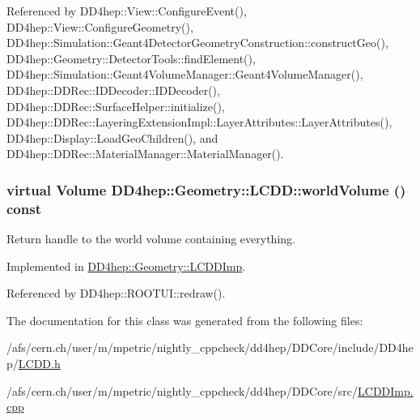 Referenced by DD4hep::View::ConfigureEvent(), DD4hep::View::ConfigureGeometry(), DD4hep::Simulation::Geant4DetectorGeometryConstruction::constructGeo(), DD4hep::Geometry::DetectorTools::findElement(), DD4hep::Simulation::Geant4VolumeManager::Geant4VolumeManager(), DD4hep::DDRec::IDDecoder::IDDecoder(), DD4hep::DDRec::SurfaceHelper::initialize(), DD4hep::DDRec::LayeringExtensionImpl::LayerAttributes::LayerAttributes(), DD4hep::Display::LoadGeoChildren(), and DD4hep::DDRec::MaterialManager::MaterialManager().\hypertarget{class_d_d4hep_1_1_geometry_1_1_l_c_d_d_aa7d089039516ff312cf95168288019fe}{
\subsubsection[{worldVolume}]{\setlength{\rightskip}{0pt plus 5cm}virtual {\bf Volume} DD4hep::Geometry::LCDD::worldVolume () const}}
\label{class_d_d4hep_1_1_geometry_1_1_l_c_d_d_aa7d089039516ff312cf95168288019fe}


Return handle to the world volume containing everything. 

Implemented in \hyperlink{class_d_d4hep_1_1_geometry_1_1_l_c_d_d_imp_a299a2cba9bd2dcb247df2e254fb07125}{DD4hep::Geometry::LCDDImp}.

Referenced by DD4hep::ROOTUI::redraw().

The documentation for this class was generated from the following files:\begin{DoxyCompactItemize}
\item 
/afs/cern.ch/user/m/mpetric/nightly\_\-cppcheck/dd4hep/DDCore/include/DD4hep/\hyperlink{_l_c_d_d_8h}{LCDD.h}\item 
/afs/cern.ch/user/m/mpetric/nightly\_\-cppcheck/dd4hep/DDCore/src/\hyperlink{_l_c_d_d_imp_8cpp}{LCDDImp.cpp}\end{DoxyCompactItemize}
